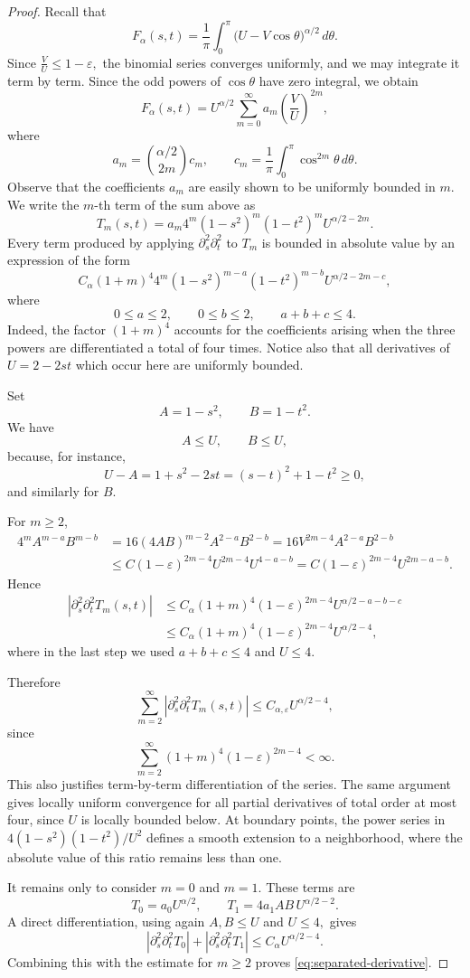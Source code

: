 \documentclass[11pt]{amsart}
\begin{document}
\begin{proof}
Recall that
\[
F_\alpha(s,t)
=
\frac1\pi\int_0^\pi
\bigl(U-V\cos\theta\bigr)^{\alpha/2}\,d\theta .
\]
Since $\frac{V}{U}\le1-\varepsilon,$
the binomial series converges uniformly, and we may integrate it term by
term. Since the odd powers of $\cos\theta$ have zero integral, we obtain
\[
F_\alpha(s,t)
=
U^{\alpha/2}
\sum_{m=0}^\infty
a_m
\left(\frac{V}{U}\right)^{2m},
\]
where
\[
a_m
=
\binom{\alpha/2}{2m}c_m,
\qquad
c_m
=
\frac1\pi\int_0^\pi\cos^{2m}\theta\,d\theta.
\]
Observe that the coefficients $a_m$ are easily shown to be uniformly bounded in $m$. We write the $m$-th term of the sum above as
\[
T_m(s,t)
=
a_m4^m
(1-s^2)^m(1-t^2)^m
U^{\alpha/2-2m}.
\]
Every term produced by applying
$\partial_s^2\partial_t^2$ to $T_m$ is bounded in absolute value by an expression of the
form
\[
C_\alpha(1+m)^4
4^m
(1-s^2)^{m-a}
(1-t^2)^{m-b}
U^{\alpha/2-2m-c},
\]
where
\[
0\le a\le2,\qquad
0\le b\le2,\qquad
a+b+c\le4.
\]
Indeed, the factor $(1+m)^4$ accounts for the coefficients arising when
the three powers are differentiated a total of four times. Notice also
that all derivatives of $U=2-2st$
which occur here are uniformly bounded.

Set
\[
A=1-s^2,\qquad B=1-t^2.
\]
We have
\[
A\le U,\qquad B\le U,
\]
because, for instance,
\[
U-A
=
1+s^2-2st
=
(s-t)^2+1-t^2
\ge0,
\]
and similarly for $B$.

For $m\ge2$,
\begin{align*}
4^mA^{m-a}B^{m-b}
&=
16(4AB)^{m-2}A^{2-a}B^{2-b}=
16V^{2m-4}A^{2-a}B^{2-b}\\
&\le
C(1-\varepsilon)^{2m-4}
U^{2m-4}U^{4-a-b}=
C(1-\varepsilon)^{2m-4}
U^{2m-a-b}.
\end{align*}
Hence
\begin{align*}
\left|
\partial_s^2\partial_t^2T_m(s,t)
\right|
&\le
C_\alpha(1+m)^4
(1-\varepsilon)^{2m-4}
U^{\alpha/2-a-b-c}\\
&\le
C_\alpha(1+m)^4
(1-\varepsilon)^{2m-4}
U^{\alpha/2-4},
\end{align*}
where in the last step we used $a+b+c\le4$ and $U\le4$.

Therefore
\[
\sum_{m=2}^{\infty}
\left|
\partial_s^2\partial_t^2T_m(s,t)
\right|
\le
C_{\alpha,\varepsilon}U^{\alpha/2-4},
\]
since
\[
\sum_{m=2}^\infty
(1+m)^4(1-\varepsilon)^{2m-4}<\infty.
\]
This also justifies term-by-term differentiation of the series.
The same argument gives locally uniform convergence for all
partial derivatives of total order at most four, since $U$ is locally
bounded below. At boundary points, the power series in
$4(1-s^2)(1-t^2)/U^2$ defines a smooth extension to a neighborhood,
where the absolute value of this ratio remains less than one.

It remains only to consider $m=0$ and $m=1$. These terms are
\[
T_0=a_0U^{\alpha/2},
\qquad
T_1=4a_1AB\,U^{\alpha/2-2}.
\]
A direct differentiation, using again
$A,B\le U$ and $U\le4,$
gives
\[
\left|\partial_s^2\partial_t^2T_0\right|
+
\left|\partial_s^2\partial_t^2T_1\right|
\le
C_\alpha U^{\alpha/2-4}.
\]
Combining this with the estimate for $m\ge2$ proves
\eqref{eq:separated-derivative}.
\end{proof}
\end{document}
